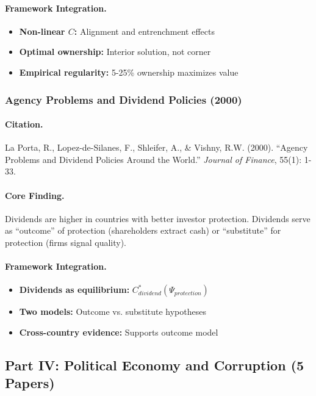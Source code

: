 \paragraph{Framework Integration.}
\begin{itemize}
  \item \textbf{Non-linear $C$:} Alignment and entrenchment effects
  \item \textbf{Optimal ownership:} Interior solution, not corner
  \item \textbf{Empirical regularity:} 5-25\% ownership maximizes value
\end{itemize}

\subsubsection{Agency Problems and Dividend Policies (2000)}

\paragraph{Citation.}
La Porta, R., Lopez-de-Silanes, F., Shleifer, A., \& Vishny, R.W. (2000).
``Agency Problems and Dividend Policies Around the World.''
\emph{Journal of Finance}, 55(1): 1-33.

\paragraph{Core Finding.}
Dividends are higher in countries with better investor protection.
Dividends serve as ``outcome'' of protection (shareholders extract cash)
or ``substitute'' for protection (firms signal quality).

\paragraph{Framework Integration.}
\begin{itemize}
  \item \textbf{Dividends as equilibrium:} $C^*_{dividend}(\Psi_{protection})$
  \item \textbf{Two models:} Outcome vs. substitute hypotheses
  \item \textbf{Cross-country evidence:} Supports outcome model
\end{itemize}

\subsection{Part IV: Political Economy and Corruption (5 Papers)}

